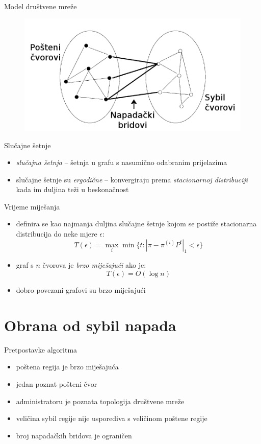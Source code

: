 \documentclass{beamer}
\begin{document}
\begin{frame}{Model društvene mreže}
  \begin{figure}
    \includegraphics[scale=0.3]{attack.png}
  \end{figure}
\end{frame}

\begin{frame}{Slučajne šetnje}
  \begin{itemize}
    \item \textit{slučajna šetnja} -- šetnja u grafu s nasumično odabranim prijelazima
    \item slučajne šetnje su \textit{ergodične} -- konvergiraju prema \textit{stacionarnoj distribuciji} kada im duljina teži u beskonačnost
  \end{itemize}
\end{frame}

\begin{frame}{Vrijeme miješanja}
  \begin{itemize}
    \item definira se kao najmanja duljina slučajne šetnje kojom se postiže stacionarna distribucija do neke mjere $\epsilon$:
      \[ T(\epsilon) = \max_{i} \min \{t : |\pi - \pi^{(i)} P^t|_1 < \epsilon\} \]
    \item graf s $n$ čvorova je \textit{brzo miješajući} ako je:
      \[ T(\epsilon) = O(\log n) \]
    \item dobro povezani grafovi su brzo miješajući
  \end{itemize}
\end{frame}

\section{Obrana od sybil napada}

\begin{frame}{Pretpostavke algoritma}
  \begin{itemize}
    \item poštena regija je brzo miješajuća
    \item jedan poznat pošteni čvor
    \item administratoru je poznata topologija društvene mreže
    \item veličina sybil regije nije usporediva s veličinom poštene regije
    \item broj napadačkih bridova je ograničen
  \end{itemize}
\end{frame}
\end{document}
